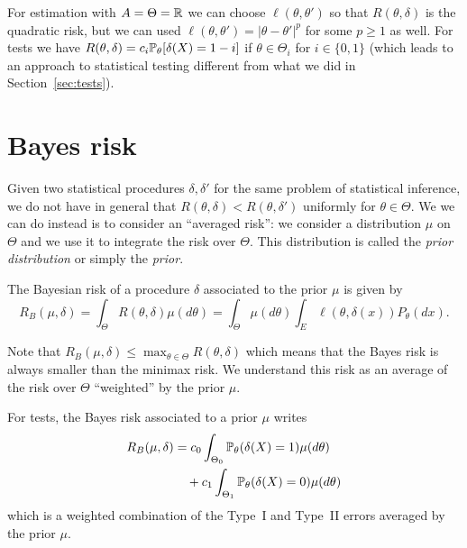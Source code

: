 \begin{example}
	For estimation with $A = \Theta = \R$ we can choose $\ell(\theta, \theta')$ so that $R(\theta, \delta)$ is the quadratic risk, but we can used $\ell(\theta, \theta') = |\theta - \theta'|^p$ for some $p \geq 1$ as well. For tests we have $R(\theta, \delta) = c_i \P_\theta[\delta(X) = 1 - i]$ if $\theta \in \Theta_i$ for $i \in \{ 0, 1\}$ (which leads to an approach to statistical testing different from what we did in Section~\ref{sec:tests}).
\end{example}


\section{Bayes risk} %


Given two statistical procedures $\delta, \delta'$ for the same problem of statistical inference, we do not have in general that $R(\theta, \delta) < R(\theta, \delta')$ uniformly for $\theta \in \Theta$.
We we can do instead is to consider an ``averaged risk'': we consider a distribution $\mu$ on $\Theta$ and we use it to integrate the risk over $\Theta$.
This distribution is called the \emph{prior distribution} or simply the \emph{prior}.
\begin{definition}
	The Bayesian risk of a procedure $\delta$ associated to the prior $\mu$ is given by
	\begin{equation*}
		R_B(\mu, \delta) = \int_{\Theta} R(\theta, \delta) \mu(d \theta) = \int_{\Theta} \mu(d \theta) 
		\int_E \ell(\theta, \delta(x)) P_\theta(dx).
	\end{equation*}
\end{definition}
Note that $R_B(\mu, \delta) \leq \max_{\theta \in \Theta} R(\theta, \delta)$ which means that the Bayes risk is always smaller than the minimax risk.
We understand this risk as an average of the risk over $\Theta$ ``weighted'' by the prior $\mu$.
\begin{example}
	For tests, the Bayes risk associated to a prior $\mu$ writes
	\begin{align*}
		R_B(\mu, \delta) &= c_0 \int_{\Theta_0} \P_\theta(\delta(X) = 1) \mu(d \theta) \\
		& \quad + c_1 \int_{\Theta_1} \P_\theta(\delta(X) = 0) \mu(d \theta)
	\end{align*}
	which is a weighted combination of the Type~I and Type~II errors averaged by the prior $\mu$.
\end{example}

